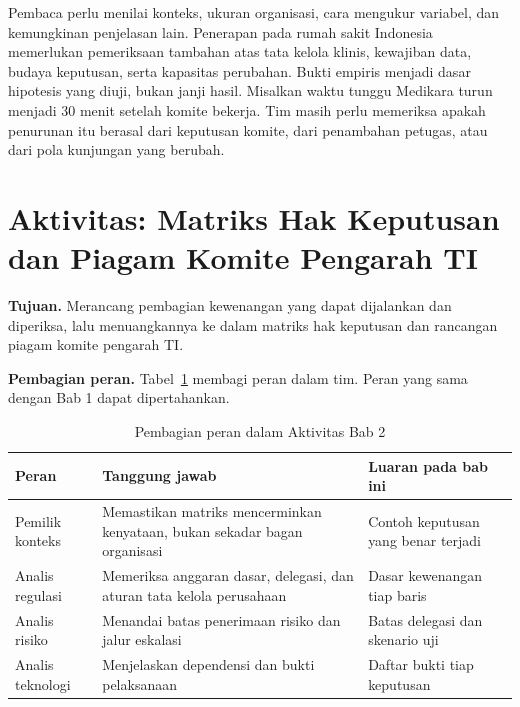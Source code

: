 Pembaca perlu menilai konteks, ukuran organisasi, cara mengukur variabel, dan kemungkinan
penjelasan lain. Penerapan pada rumah sakit Indonesia memerlukan pemeriksaan tambahan atas tata
kelola klinis, kewajiban data, budaya keputusan, serta kapasitas perubahan. Bukti empiris menjadi
dasar hipotesis yang diuji, bukan janji hasil. Misalkan waktu tunggu Medikara turun menjadi 30
menit setelah komite bekerja. Tim masih perlu memeriksa apakah penurunan itu berasal dari keputusan
komite, dari penambahan petugas, atau dari pola kunjungan yang berubah.

\section{Aktivitas: Matriks Hak Keputusan dan Piagam Komite Pengarah TI}

\textbf{Tujuan.} Merancang pembagian kewenangan yang dapat dijalankan dan diperiksa, lalu
menuangkannya ke dalam matriks hak keputusan dan rancangan piagam komite pengarah TI.

\textbf{Pembagian peran.} Tabel~\ref{tab:ch02-peran-tim} membagi peran dalam tim. Peran yang sama
dengan Bab 1 dapat dipertahankan.

\begin{table}[!htb]
  \centering\small
  \caption{Pembagian peran dalam Aktivitas Bab 2}\label{tab:ch02-peran-tim}
  \begin{tabularx}{\textwidth}{|>{\raggedright\arraybackslash}p{}|>{\raggedright\arraybackslash}X|>{\raggedright\arraybackslash}p{}|}
    \hline
    \textbf{Peran} & \textbf{Tanggung jawab} & \textbf{Luaran pada bab ini} \\ \hline
    Pemilik konteks & Memastikan matriks mencerminkan kenyataan, bukan sekadar bagan organisasi &
    Contoh keputusan yang benar terjadi \\ \hline
    Analis regulasi & Memeriksa anggaran dasar, delegasi, dan aturan tata kelola perusahaan &
    Dasar kewenangan tiap baris \\ \hline
    Analis risiko & Menandai batas penerimaan risiko dan jalur eskalasi & Batas delegasi dan
    skenario uji \\ \hline
    Analis teknologi & Menjelaskan dependensi dan bukti pelaksanaan & Daftar bukti tiap keputusan
    \\ \hline
  \end{tabularx}
\end{table}

